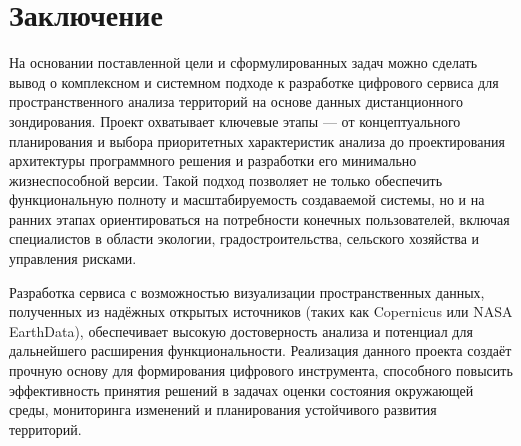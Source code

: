 \chapter{Заключение}
На основании поставленной цели и сформулированных задач можно сделать вывод о комплексном и системном подходе к разработке цифрового сервиса для пространственного анализа территорий на основе данных дистанционного зондирования. Проект охватывает ключевые этапы — от концептуального планирования и выбора приоритетных характеристик анализа до проектирования архитектуры программного решения и разработки его минимально жизнеспособной версии. Такой подход позволяет не только обеспечить функциональную полноту и масштабируемость создаваемой системы, но и на ранних этапах ориентироваться на потребности конечных пользователей, включая специалистов в области экологии, градостроительства, сельского хозяйства и управления рисками.

Разработка сервиса с возможностью визуализации пространственных данных, полученных из надёжных открытых источников (таких как Copernicus или NASA EarthData), обеспечивает высокую достоверность анализа и потенциал для дальнейшего расширения функциональности. Реализация данного проекта создаёт прочную основу для формирования цифрового инструмента, способного повысить эффективность принятия решений в задачах оценки состояния окружающей среды, мониторинга изменений и планирования устойчивого развития территорий.
